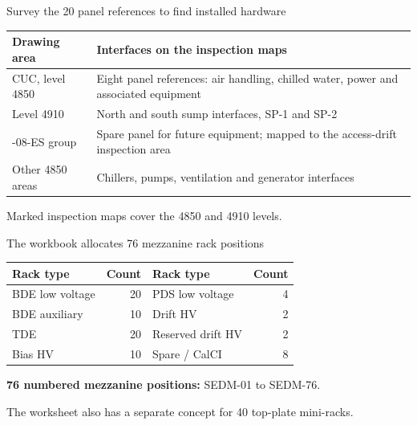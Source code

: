 \begin{frame}{Survey the 20 panel references to find installed hardware}
  \renewcommand{\arraystretch}{1.4}
  \begin{tabularx}{\textwidth}{@{}>{\RaggedRight\arraybackslash}p{3.4cm}>{\RaggedRight\arraybackslash}X@{}}
    \toprule
    \textbf{Drawing area} & \textbf{Interfaces on the inspection maps}\\
    \midrule
    CUC, level 4850 & Eight panel references: air handling, chilled water, power and associated equipment\\
    Level 4910 & North and south sump interfaces, SP-1 and SP-2\\
    4850-08-ES group & Spare panel for future equipment; mapped to the access-drift inspection area\\
    Other 4850 areas & Chillers, pumps, ventilation and generator interfaces\\
    \bottomrule
  \end{tabularx}\par
  \medskip
  Marked inspection maps cover the 4850 and 4910 levels.
\end{frame}

\begin{frame}{The workbook allocates 76 mezzanine rack positions}
  \renewcommand{\arraystretch}{1.15}
  \begin{tabularx}{\textwidth}{@{}>{\RaggedRight\arraybackslash}Xr>{\RaggedRight\arraybackslash}Xr@{}}
    \toprule
    \textbf{Rack type} & \textbf{Count} & \textbf{Rack type} & \textbf{Count}\\
    \midrule
    BDE low voltage & 20 & PDS low voltage & 4\\
    BDE auxiliary & 10 & Drift HV & 2\\
    TDE & 20 & Reserved drift HV & 2\\
    Bias HV & 10 & Spare / CalCI & 8\\
    \bottomrule
  \end{tabularx}\par
  \bigskip
  \textbf{76 numbered mezzanine positions:} SEDM-01 to SEDM-76.\par
  \medskip
  The worksheet also has a separate concept for 40 top-plate mini-racks.
\end{frame}


